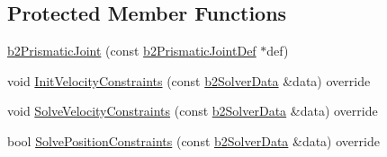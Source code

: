 \subsection*{Protected Member Functions}
\begin{DoxyCompactItemize}
\item 
\mbox{\hyperlink{classb2_prismatic_joint_ab1586a2334f7e32137fbd7f807e249ca}{b2\+Prismatic\+Joint}} (const \mbox{\hyperlink{structb2_prismatic_joint_def}{b2\+Prismatic\+Joint\+Def}} $\ast$def)
\item 
void \mbox{\hyperlink{classb2_prismatic_joint_a840e9885d49bf621c46df79733df21dc}{Init\+Velocity\+Constraints}} (const \mbox{\hyperlink{structb2_solver_data}{b2\+Solver\+Data}} \&data) override
\item 
void \mbox{\hyperlink{classb2_prismatic_joint_a028c0ca03ca8437606d1175ca8de63d6}{Solve\+Velocity\+Constraints}} (const \mbox{\hyperlink{structb2_solver_data}{b2\+Solver\+Data}} \&data) override
\item 
bool \mbox{\hyperlink{classb2_prismatic_joint_ac841608a56e83f709e08b805ed8c92e3}{Solve\+Position\+Constraints}} (const \mbox{\hyperlink{structb2_solver_data}{b2\+Solver\+Data}} \&data) override
\end{DoxyCompactItemize}
